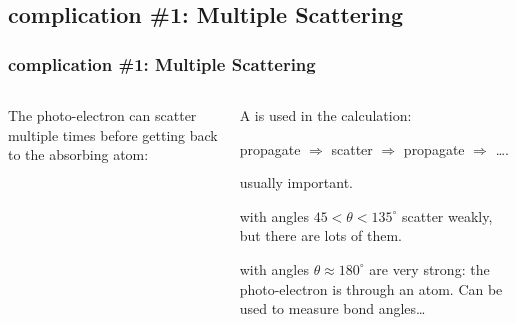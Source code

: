 \subsection{{\feff} complication \#1: Multiple Scattering}
\begin{frame} \frametitle{{\feff} complication \#1: Multiple Scattering}

  \vmm
\begin{columns}
  \begin{column}{50mm}
  The photo-electron can scatter multiple times before getting back to the
  absorbing atom:

  \begin{center}
  \end{center}

  \end{column}
  \begin{column}{60mm}

  A {} is used in the  calculation:

  \begin{center}
    propagate $\Rightarrow$ scatter $\Rightarrow$ propagate $\Rightarrow$ \ldots.
  \end{center}

  \vmm  \pause
    usually important.

   with angles $ 45 < \theta <
  135^{\circ}$ scatter weakly, but there are lots of them.

   with angles $\theta \approx 180^{\circ}$
   are very strong: the photo-electron is {} through an atom.
   Can be used to measure bond angles\ldots

  \end{column}
  \end{columns}

   \begin{postitbox}{92mm}
   \end{postitbox}
\end{frame}


